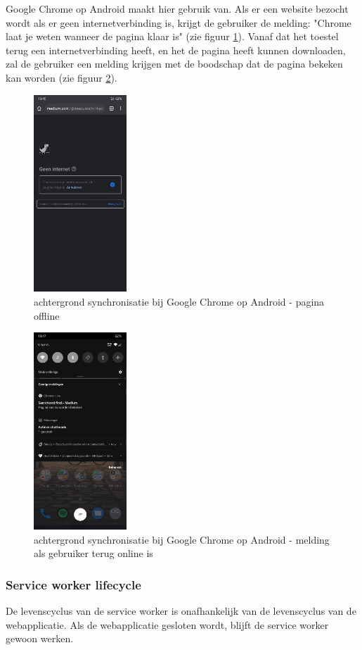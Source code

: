 		Google Chrome op Android maakt hier gebruik van. Als er een website bezocht wordt als er geen internetverbinding is, krijgt de gebruiker de melding: "Chrome laat je weten wanneer de pagina klaar is" (zie figuur \ref{fig:backSync1}). Vanaf dat het toestel terug een internetverbinding heeft, en het de pagina heeft kunnen downloaden, zal de gebruiker een melding krijgen met de boodschap dat de pagina bekeken kan worden (zie figuur \ref{fig:backSync2}).
	
	
		\begin{figure}[H]
			\centering
			\includegraphics[width=35mm]{./img/backSync1.png}{}
			\caption{achtergrond synchronisatie bij Google Chrome op Android - pagina offline}
			\label{fig:backSync1}
		\end{figure}
		
		\begin{figure}[H]
			\centering
			\includegraphics[width=35mm]{./img/backSync2.png}
			\caption{achtergrond synchronisatie bij Google Chrome op Android - melding als gebruiker terug online is}
			\label{fig:backSync2}
		\end{figure}
		\subsubsection{Service worker lifecycle }
			De levenscyclus van de service worker is onafhankelijk van de levenscyclus van de webapplicatie. Als de webapplicatie gesloten wordt, blijft de service worker gewoon werken.
			
